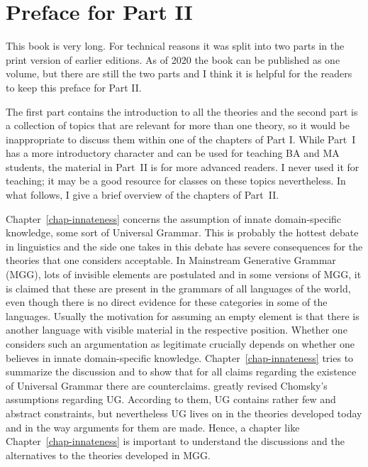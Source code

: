 
\chapter*{Preface for Part II}

\largerpage
This book is very long. For technical reasons it was split into two parts in the print version of
earlier editions. As of 2020 the book can be published as one volume, but there are still the two
parts and I think it is helpful for the readers to keep this preface for Part II.

The first part contains the introduction to all the theories and the second part is a collection of
topics that are relevant for more than one theory, so it would be inappropriate to discuss them
within one of the chapters of Part I. While Part~I has a more introductory character and can be used
for teaching BA and MA students, the material in Part~II is for more advanced readers. I never used
it for teaching; it may be a good resource for classes on these topics nevertheless. In what follows, I
give a brief overview of the chapters of Part~II.

Chapter~\ref{chap-innateness} concerns the assumption of
innate domain-specific knowledge, some sort of Universal Grammar. This is probably the hottest
debate in linguistics and the side one takes in this debate has severe consequences for the theories
that one considers acceptable. In Mainstream Generative Grammar (MGG), lots of invisible elements are
postulated and in some versions of MGG, it is claimed that these are present in the grammars of all languages of the
world, even though there is no direct evidence for these categories in some of the languages. Usually the motivation for
assuming an empty element is that there is another language with visible material in the respective
position. Whether one considers such an argumentation as legitimate crucially depends on whether one
believes in innate domain-specific knowledge. Chapter~\ref{chap-innateness} tries to summarize the
discussion and to show that for all claims regarding the existence of Universal Grammar there are
counterclaims. \citet*{HCF2002a} greatly revised Chomsky's assumptions regarding UG. According to them,
UG contains rather few and abstract constraints, but nevertheless UG lives on in the theories
developed today and in the way arguments for them are made. Hence, a chapter like
Chapter~\ref{chap-innateness} is important to understand the discussions and the alternatives to the
theories developed in MGG.

